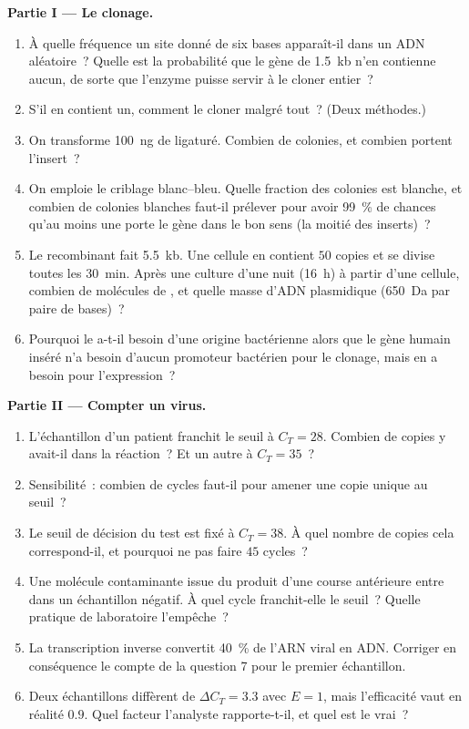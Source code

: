 \begin{problem}
\medskip
\noindent\textbf{Partie I --- Le clonage.}
\begin{enumerate}
  \item À quelle fréquence un site donné de six bases apparaît-il dans
        un ADN aléatoire~? Quelle est la probabilité que le gène de
        \qty{1.5}{kb} n'en contienne aucun, de sorte que l'enzyme
        puisse servir à le cloner entier~?
  \item S'il en contient un, comment le cloner malgré tout~? (Deux
        méthodes.)
  \item On transforme \qty{100}{ng} de  ligaturé. Combien de
        colonies, et combien portent l'insert~?
  \item On emploie le criblage blanc--bleu. Quelle fraction des
        colonies est blanche, et combien de colonies blanches faut-il
        prélever pour avoir \qty{99}{\%} de chances qu'au moins une
        porte le gène dans le bon sens (la moitié des inserts)~?
  \item Le  recombinant fait \qty{5.5}{kb}. Une cellule en
        contient $50$ copies et se divise toutes les \qty{30}{min}.
        Après une culture d'une nuit (\qty{16}{h}) à partir d'une
        cellule, combien de molécules de , et quelle masse
        d'ADN plasmidique (\qty{650}{Da} par paire de bases)~?
  \item Pourquoi le  a-t-il besoin d'une origine bactérienne
        alors que le gène humain inséré n'a besoin d'aucun promoteur
        bactérien pour le clonage, mais en a besoin pour l'expression~?
\end{enumerate}

\medskip
\noindent\textbf{Partie II --- Compter un virus.}
\begin{enumerate}[resume]
  \item L'échantillon d'un patient franchit le seuil à $C_{T} = 28$.
        Combien de copies y avait-il dans la réaction~? Et un autre à
        $C_{T} = 35$~?
  \item Sensibilité~: combien de cycles faut-il pour amener une copie
        unique au seuil~?
  \item Le seuil de décision du test est fixé à $C_{T} = 38$. À quel
        nombre de copies cela correspond-il, et pourquoi ne pas faire
        $45$ cycles~?
  \item Une molécule contaminante issue du produit d'une course
        antérieure entre dans un échantillon négatif. À quel cycle
        franchit-elle le seuil~? Quelle pratique de laboratoire
        l'empêche~?
  \item La transcription inverse convertit \qty{40}{\%} de l'ARN viral
        en ADN. Corriger en conséquence le compte de la question 7 pour
        le premier échantillon.
  \item Deux échantillons diffèrent de $\Delta C_{T} = 3.3$ avec
        $E = 1$, mais l'efficacité vaut en réalité $0.9$. Quel facteur
        l'analyste rapporte-t-il, et quel est le vrai~?
\end{enumerate}


\end{problem}
